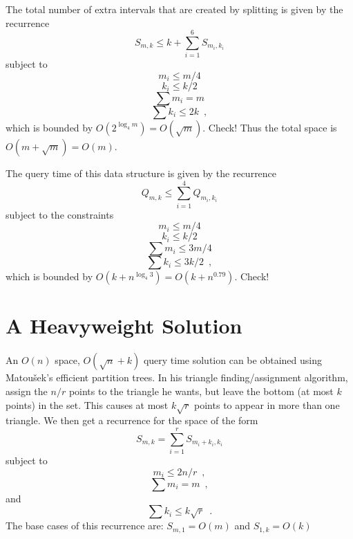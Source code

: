 \documentclass{article}
\begin{document}
The total number of extra intervals that are created by splitting is
given by the recurrence
\[
   S_{m,k} \le k + \sum_{i=1}^6 S_{m_i,k_i}
\]
subject to
\[ m_i\le m/4 \]
\[ k_i\le k/2 \]
\[ \sum m_i=m \]
\[ \sum k_i \le 2k \enspace , \] 
which is bounded by $O(2^{\log_4 m})=O(\sqrt{m})$.  Check! Thus the
total space is $O(m+\sqrt{m}) = O(m)$.

The query time of this data structure is given by the recurrence
\[
  Q_{m,k} \le \sum_{i=1}^4 Q_{m_i,k_i}
\]
subject to the constraints
\[ m_i\le m/4 \]
\[ k_i\le k/2 \]
\[ \sum m_i\le 3m/4 \]
\[ \sum k_i\le 3k/2 \enspace , \] 
which is bounded by $O(k+n^{\log_4 3})=O(k+n^{0.79})$.  Check!

\section{A Heavyweight Solution}

An $O(n)$ space, $O(\sqrt{n} + k)$ query time solution can
be obtained using Matou\v{s}ek's efficient partition trees.  In his
triangle finding/assignment algorithm, assign the $n/r$ points to the
triangle he wants, but leave the bottom (at most $k$ points) in the
set.  This causes at most $k\sqrt{r}$ points to appear in more than
one triangle.  We then get a recurrence for the space of the form
\[
    S_{m,k} = \sum_{i=1}^r S_{m_i+k_i,k_i}
\]
subject to 
\[ m_i \le 2n/r \enspace , \]
\[ \sum m_i=m \enspace , \]
and
\[ \sum k_i \le k\sqrt{r} \enspace . \] 
The base cases of this recurrence are:
$S_{m,1} = O(m)$ and $S_{1,k}=O(k)$



\end{document}

